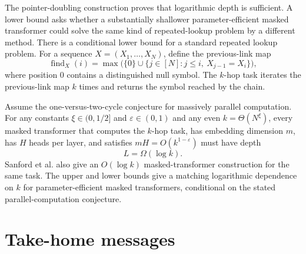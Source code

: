 \documentclass[11pt,twoside]{article}
\theoremstyle{definition}
\theoremstyle{remark}
\begin{document}
The pointer-doubling construction proves that logarithmic depth is sufficient.
A lower bound asks whether a substantially shallower parameter-efficient
masked transformer could solve the same kind of repeated-lookup problem by a
different method. There is a conditional lower bound for a standard repeated
lookup problem. For a sequence $X=(X_1,\ldots,X_N)$, define the previous-link
map
\[
 \operatorname{find}_X(i)
 =\max\bigl(\{0\}\cup\{j\in[N]:j\leq i,\ X_{j-1}=X_i\}\bigr),
\]
where position $0$ contains a distinguished null symbol. The $k$-hop task
iterates the previous-link map $k$ times and returns the symbol reached by the chain.

Assume the one-versus-two-cycle conjecture for massively parallel
computation. For any constants $\xi\in(0,1/2]$ and
$\varepsilon\in(0,1)$ and any even $k=\Theta(N^\xi)$, every masked
transformer that computes the $k$-hop task, has embedding dimension $m$, has
$H$ heads per layer, and satisfies
$mH=O(k^{1-\varepsilon})$ must have depth
\[
 L=\Omega(\log k).
\]
Sanford et al. also give an $O(\log k)$ masked-transformer construction for
the same task. The upper and lower bounds give a matching logarithmic
dependence on $k$ for parameter-efficient masked transformers, conditional on
the stated parallel-computation conjecture.

\section{Take-home messages}
\label{sec:take-home}
\end{document}
